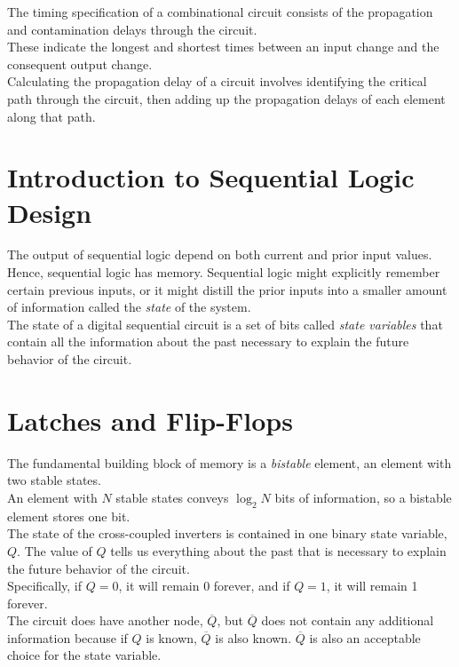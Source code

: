 \documentclass[12pt]{article}
\theoremstyle{definition}
\begin{document}
  The timing specification of a combinational circuit consists of the propagation and contamination delays through the circuit. \\
  These indicate the longest and shortest times between an input change and the consequent output change. \\
  Calculating the propagation delay of a circuit involves identifying the critical path through the circuit, then adding up the propagation delays of each element along that path.

  \section{Introduction to Sequential Logic Design}
  The output of sequential logic depend on both current and prior input values. \\
  Hence, sequential logic has memory.
  Sequential logic might explicitly remember certain previous inputs, or it might distill the prior inputs into a smaller amount of information called the \emph {state} of the system. \\
  The state of a digital sequential circuit is a set of bits called \emph{state variables} that contain all the information about the past necessary to explain the future behavior of the circuit.

  \section{Latches and Flip-Flops}
  The fundamental building block of memory is a \emph{bistable} element, an element with two stable states. \\
  An element with $N$ stable states conveys $\log_{2}N$ bits of information, so a bistable element stores one bit. \\
  The state of the cross-coupled inverters is contained in one binary state variable, $Q$.
  The value of $Q$ tells us everything about the past that is necessary to explain the future behavior of the circuit. \\
  Specifically, if $Q = 0$, it will remain 0 forever, and if $Q = 1$, it will remain 1 forever. \\
  The circuit does have another node, $\overline{Q}$, but $\overline{Q}$ does not contain any additional information because if $Q$ is known, $\overline{Q}$ is also known.
  $\overline{Q}$ is also an acceptable choice for the state variable. \\
\end{document}
